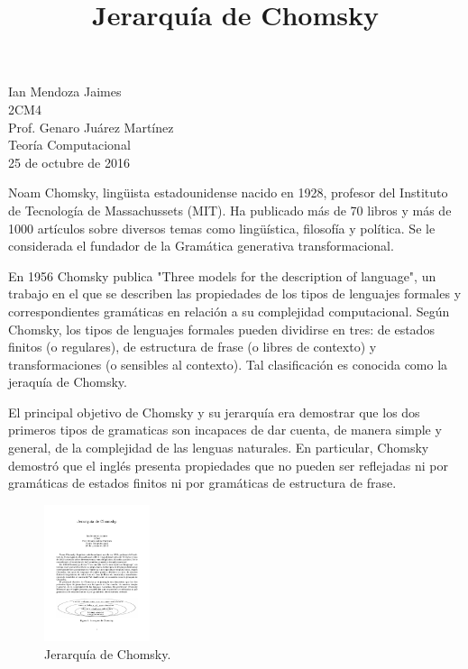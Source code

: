 \documentclass[12pt]{article}
\title{Jerarquía de Chomsky}
\date{}
\begin{document}
	\maketitle
	\begin{center}
		Ian Mendoza Jaimes\\
		2CM4\\
		Prof. Genaro Juárez Martínez\\
		Teoría Computacional\\
		25 de octubre de 2016\\
	\end{center}

\vspace{2em}
	Noam Chomsky, lingüista estadounidense nacido en 1928, profesor del Instituto de Tecnología de Massachussets (MIT). Ha publicado más de 70 libros y más de 1000 artículos sobre diversos temas como lingüística, filosofía y política. Se le considerada el fundador de la Gramática generativa transformacional. 

En 1956 Chomsky publica "Three models for the description of language", un trabajo en el que se describen las propiedades de los tipos de lenguajes formales y correspondientes gramáticas en relación a su complejidad computacional. Según Chomsky, los tipos de lenguajes formales pueden dividirse en tres: de estados finitos (o regulares), de estructura de frase (o libres de contexto) y transformaciones (o sensibles al contexto). Tal clasificación es conocida como la jeraquía de Chomsky.

El principal objetivo de Chomsky y su jerarquía era demostrar que los dos primeros tipos de gramaticas son incapaces de dar cuenta, de manera simple y general, de la complejidad de las lenguas naturales. En particular, Chomsky demostró que el inglés presenta propiedades que no pueden ser reflejadas ni por gramáticas de estados finitos ni por gramáticas de estructura de frase.

\vspace{1em}

\begin{figure}[H]
\includegraphics[width=\textwidth, height=4cm]{jerarquia}
\caption{Jerarquía de Chomsky.}
\label{fig:jerarquia}
\end{figure}
\end{document}
